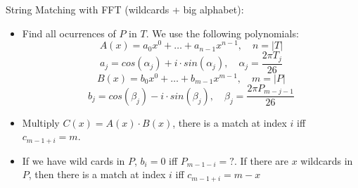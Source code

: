 
String Matching with FFT (wildcards + big alphabet):

\begin{itemize}
    \item Find all ocurrences of $P$ in $T$. We use the following polynomials:
    \[A(x) = a_0x^0 + \dots + a_{n-1}x^{n-1}, \quad n = |T|\]
    \[a_j = cos(\alpha_j) + i \cdot sin(\alpha_j), \quad \alpha_j = \frac{2 \pi T_j}{26}\]
    \[B(x) = b_0x^0 + \dots + b_{m-1}x^{m-1}, \quad m = |P|\]
    \[b_j = cos(\beta_j) - i \cdot sin(\beta_j), \quad \beta_j = \frac{2 \pi P_{m-j-1}}{26}\]

    \item Multiply $C(x) = A(x) \cdot B(x)$, there is a match at index $i$ iff $c_{m-1+i} = m$.

    \item If we have wild cards in $P$, $b_i = 0$ iff $P_{m-1-i} = ?$. If there are $x$ wildcards
    in $P$, then there is a match at index $i$ iff $c_{m-1+i} = m-x$
\end{itemize}